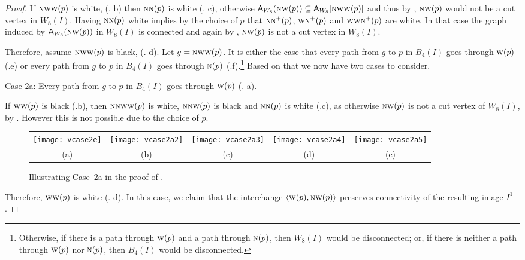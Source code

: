 \documentclass[lotsofwhite,charterfonts]{patmorin}
\newcommand{\N}{\textsc{n}}
\newcommand{\W}{\textsc{w}}
\newcommand{\NW}{\textsc{nw}}
\newcommand{\ic}[2]{\langle #1,#2 \rangle}
\newcommand{\A}[2]{\ensuremath{\protect\textup{\textsf{A}}_{#2}(#1)}}
\newcommand{\AC}[2]{\ensuremath{\protect\textup{\textsf{A}}_{#2}[#1]}}
\newcommand{\se}{\ensuremath{\subseteq}}
\begin{document}
\begin{proof}
If $\NW\W(p)$ is white, (. b) then $\N\N(p)$ is white
(. c), otherwise $\A{\NW(p)}{W_8}\se
\AC{\NW\W(p)}{W_8}$ and thus by , $\NW(p)$ would not
be a cut vertex in $W_8(I)$. Having $\N\N(p)$ white implies by the
choice of $p$ that $\N\N^+(p)$, $\W\N^+(p)$ and $\W\W\N^+(p)$ are
white. In that case the graph induced by \A{\NW(p)}{W_8} in $W_8(I)$
is connected and again by , $\NW(p)$ is not a cut
vertex in $W_8(I)$.


Therefore, assume $\NW\W(p)$ is black, (. d). Let
$g=\NW\W(p)$. It is either the case that every path from $g$ to $p$ in
$B_4(I)$ goes through $\W(p)$  (.e) or every path from
$g$ to $p$ in $B_4(I)$ goes through $\N(p)$
(.f).\footnote{Otherwise, if there is a path through
$\W(p)$ and a path through $\N(p)$, then $W_8(I)$ would be
disconnected; or, if there is neither a path through $\W(p)$ nor
$\N(p)$, then $B_4(I)$ would be disconnected.} Based on that we now
have two cases to consider.

\noindent Case 2a: Every path from $g$ to $p$ in $B_4(I)$ goes through
$\W(p)$ (. a). 

If $\W\W(p)$ is black (.b), then $\N\N\W\W(p)$ is white,
$\N\N\W(p)$ is black and  $\N\N(p)$ is white (.c), as
otherwise $\NW(p)$ is not a cut vertex of $W_8(I)$, by
. However this is not possible due to the choice of
$p$.

\begin{figure}[htbp]
\begin{center}
\begin{tabular}{ccccc}
\texttt{[image: vcase2e]} & 
\texttt{[image: vcase2a2]} & 
\texttt{[image: vcase2a3]} & 
\texttt{[image: vcase2a4]} &
\texttt{[image: vcase2a5]}
\\
(a) & (b) & (c) & (d) & (e)
\end{tabular}
\end{center}
\caption{Illustrating Case~2a in the proof of .}
\end{figure}

Therefore,  $\W\W(p)$ is white (. d). In this case, we claim that the interchange $\ic{\W(p)}{\NW(p)}$ preserves connectivity of the resulting image $I^1$. 



\end{proof}
\end{document}
